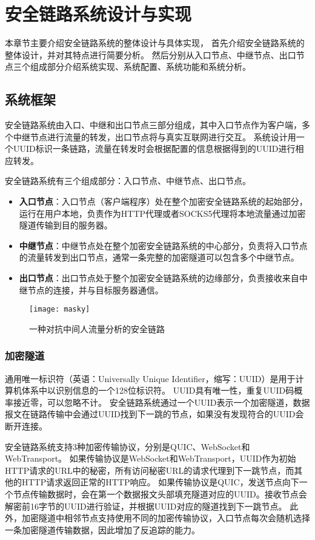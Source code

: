 \chapter{安全链路系统设计与实现}
本章节主要介绍安全链路系统的整体设计与具体实现，
首先介绍安全链路系统的整体设计，并对其特点进行简要分析。
然后分别从入口节点、中继节点、出口节点三个组成部分介绍系统实现、系统配置、系统功能和系统分析。

\section{系统框架}
安全链路系统由入口、中继和出口节点三部分组成，其中入口节点作为客户端，多个中继节点进行流量的转发，出口节点将与真实互联网进行交互。
系统设计用一个UUID标识一条链路，流量在转发时会根据配置的信息根据得到的UUID进行相应转发。

安全链路系统有三个组成部分：入口节点、中继节点、出口节点。
\begin{itemize}
  \item \textbf{入口节点}：入口节点（客户端程序）处在整个加密安全链路系统的起始部分，运行在用户本地，负责作为HTTP代理或者SOCKS5代理将本地流量通过加密隧道传输到目的服务器。
  \item \textbf{中继节点}：中继节点处在整个加密安全链路系统的中心部分，负责将入口节点的流量转发到出口节点，通常一条完整的加密隧道可以包含多个中继节点。
  \item \textbf{出口节点}：出口节点处于整个加密安全链路系统的边缘部分，负责接收来自中继节点的连接，并与目标服务器通信。
\end{itemize}

\begin{figure}[H]
  \centering
  \texttt{[image: masky]}
  \caption{一种对抗中间人流量分析的安全链路}
\end{figure}

\subsection{加密隧道}
通用唯一标识符（英语：Universally Unique Identifier，缩写：UUID）是用于计算机体系中以识别信息的一个128位标识符。
UUID具有唯一性，重复UUID码概率接近零，可以忽略不计。
安全链路系统通过一个UUID表示一个加密隧道，数据报文在链路传输中会通过UUID找到下一跳的节点，如果没有发现符合的UUID会断开连接。

安全链路系统支持3种加密传输协议，分别是QUIC、WebSocket和WebTransport。
如果传输协议是WebSocket和WebTransport，UUID作为初始HTTP请求的URL中的秘密，所有访问秘密URL的请求代理到下一跳节点，而其他的HTTP请求返回正常的HTTP响应。
如果传输协议是QUIC，发送节点向下一个节点传输数据时，会在第一个数据报文头部填充隧道对应的UUID。接收节点会解密前16字节的UUID进行验证，并根据UUID对应的隧道找到下一跳节点。
此外，加密隧道中相邻节点支持使用不同的加密传输协议，入口节点每次会随机选择一条加密隧道传输数据，因此增加了反追踪的能力。

